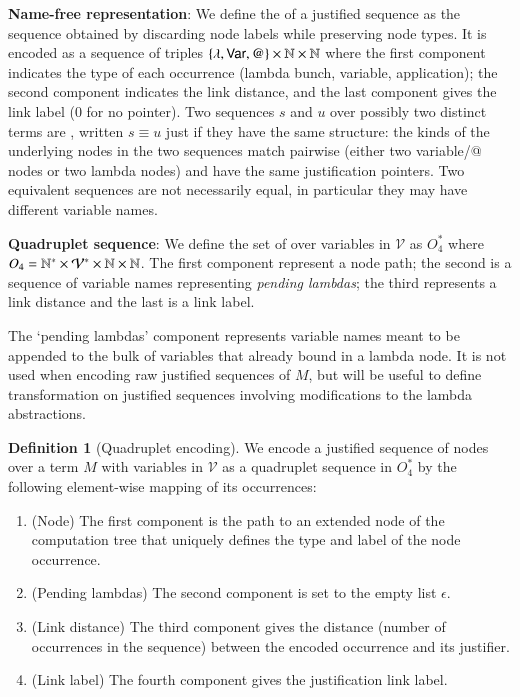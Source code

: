 \documentclass{elsarticle}
\theoremstyle{plain}
\theoremstyle{definition}
\newtheorem{definition}{Definition}[section]
\theoremstyle{remark}
\begin{document}
{\bf Name-free representation}: We define the  of a justified sequence as the sequence obtained by discarding node labels while preserving node types. It is encoded as a sequence of triples $\{\lambda, {\sf Var}, @ \}\times\mathbb{N}\times\mathbb{N}$ where the first component indicates the type of each occurrence (lambda bunch, variable, application); the second component indicates the link distance, and the last component gives the link label ($0$ for no pointer).
Two sequences $s$ and $u$ over possibly two distinct terms are , written $s \equiv u$ just if they have the same structure: the kinds of the underlying nodes in the two sequences match pairwise (either two variable/@ nodes or two lambda nodes) and have the same justification pointers. Two equivalent sequences are not necessarily equal, in particular they may have different variable names.

{\bf Quadruplet sequence}:
We define the set of  over variables in $\mathcal{V}$ as $O_4^*$ where $O_4 = \mathbb{N}^*\times \mathcal{V}^* \times\mathbb{N}\times\mathbb{N}$. The first component represent a node path; the second is a sequence of variable names representing \emph{pending lambdas}; the third represents a link distance and the last is a link label.

The `pending lambdas' component represents variable names meant to be appended to the bulk of variables that already bound in a lambda node. It is not used when encoding raw justified sequences of $M$, but will be useful to define transformation on justified sequences involving modifications to the lambda abstractions.

\begin{definition}[Quadruplet encoding]
    \label{def:quadruplet_encoding}
    We encode a justified sequence of nodes over a term $M$
    with variables in $\mathcal{V}$ as a quadruplet sequence in $O_4^*$ by the following element-wise mapping of its occurrences:
    \begin{enumerate}[nosep]
        \item (Node) The first component is the path to an extended node of the computation tree that uniquely defines the type and label of the node occurrence.
        \item (Pending lambdas) The second component is set to the empty list $\epsilon$.
        \item (Link distance) The third component gives the distance (number of occurrences in the sequence) between the encoded occurrence and its justifier.
        \item (Link label) The fourth component gives the justification link label.
    \end{enumerate}
\end{definition}
\end{document}
